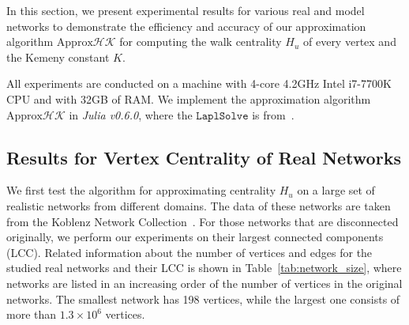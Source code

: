 \documentclass[sigconf]{acmart}
\begin{document}
In this section, we present experimental results for various real and model networks to demonstrate the  efficiency and accuracy of our approximation algorithm $\text{Approx}\mathcal{HK}$ for computing the walk centrality $H_u$ of  every vertex and the Kemeny constant $K$.

All   experiments are conducted on  a machine  with 4-core 4.2GHz  Intel i7-7700K CPU and with  32GB of RAM. We implement the approximation algorithm $\text{Approx}\mathcal{HK}$ in \textit{Julia v0.6.0}, where  the $\mathtt{LaplSolve}$ is from~\cite{KySa16}. %

\subsection{Results for Vertex Centrality of Real Networks }

We first test the algorithm for approximating  centrality $H_u$ on a large set of  realistic  networks from different domains.  The  data of these networks are taken from the Koblenz Network Collection~\cite{Ku13}. For those networks that are disconnected originally, we perform our experiments on their largest connected components (LCC). Related information about the number of vertices and edges for the studied real networks and their LCC  is  shown  in Table~\ref{tab:network_size},  where networks are listed in an increasing order of the number of vertices in the original networks. The smallest network has 198 vertices, while the largest one consists of more than $1.3 \times 10^{6}$ vertices.
\end{document}
